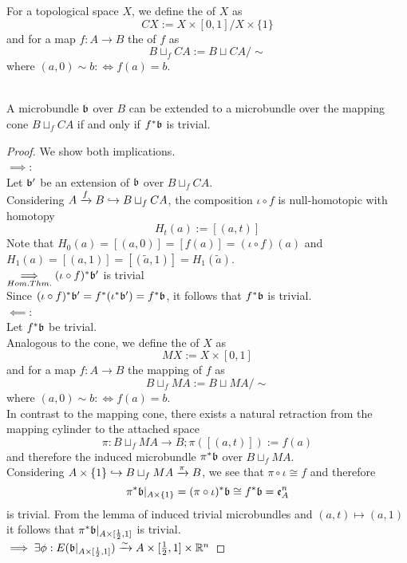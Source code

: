 For a topological space $X$, we define the  of $X$ as 
\[ CX := X \times [0, 1] / X \times \{1\} \]
and for a map $f: A \to B$ the  of $f$ as
\[ B \sqcup_f CA := B \sqcup CA / \sim \]
where $(a, 0) \sim b :\iff f(a) = b$.

\\ A microbundle $\mathfrak{b}$ over $B$ can be extended to a microbundle over the mapping cone $B \sqcup_f CA$ if and only if $f^*\mathfrak{b}$ is trivial.
\begin{proof}
    We show both implications.
    \\ $\implies$:
    \\ Let $\mathfrak{b}'$ be an extension of $\mathfrak{b}$ over $B \sqcup_f CA$.
    \\ Considering $A \xrightarrow{f} B \hookrightarrow{} B \sqcup_f CA$, the composition $\iota \circ f$ is null-homotopic with homotopy
    \[ H_t(a) := [(a, t)] \]
    Note that $H_0(a) = [(a, 0)] = [f(a)] = (\iota \circ f)(a)$ and $H_1(a) = [(a, 1)] = [(\tilde{a}, 1)] = H_1(\tilde{a})$.
    \\ $\underset{Hom. Thm.}{\implies} (\iota \circ f)^*\mathfrak{b}'$ is trivial
    \\ Since $(\iota \circ f)^*\mathfrak{b}' = f^*(\iota^*\mathfrak{b}') = f^*\mathfrak{b}$, it follows that $f^*\mathfrak{b}$ is trivial.
    \\ $\impliedby$:
    \\ Let $f^*\mathfrak{b}$ be trivial.
    \\ Analogous to the cone, we define the  of $X$ as
    \[ MX := X \times [0, 1] \]
    and for a map $f: A \to B$ the mapping  of $f$ as
    \[ B \sqcup_f MA := B \sqcup MA / \sim \]
    where $(a, 0) \sim b :\iff f(a) = b$.
    \\ In contrast to the mapping cone, there exists a natural retraction from the mapping cylinder to the attached space
    \[ \pi: B \sqcup_f MA \to B; \pi([(a, t)]) := f(a) \]
    and therefore the induced microbundle $\pi^*\mathfrak{b}$ over $B \sqcup_f MA$.
    \\ Considering $A \times \{1\} \hookrightarrow{} B \sqcup_f MA \xrightarrow{\pi} B$, we see that $\pi \circ \iota \cong f$ and therefore
    \[ \pi^*\mathfrak{b}\vert_{A \times \{1\}} = (\pi \circ \iota)^*\mathfrak{b} \cong f^*\mathfrak{b} = \mathfrak{e}^n_A\]
    is trivial. From the lemma of induced trivial microbundles and $(a, t) \mapsto (a, 1)$ it follows that $\pi^*\mathfrak{b}\vert_{A \times [\frac{1}{2}, 1]}$ is trivial.
    \\ $\implies \exists \phi: E(\mathfrak{b}\vert_{A \times [\frac{1}{2}, 1]}) \xrightarrow{\sim} A \times [\frac{1}{2}, 1] \times \mathbb{R}^n$

\end{proof}
